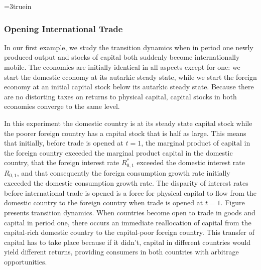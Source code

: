 \centerline{\epsfxsize=3truein}
\caption{Response to unforeseen opening of trade at time $1$.
From left to right, top to bottom: $k, c, \bar R, \eta, x,$ and $B^f$. The solid line is the domestic country, the dashed line is the foreign
country and the dashed dotted line is the original
steady state in the domestic economy.}
\endfigure


\subsubsection{Opening International Trade}
In our
first example, we study the transition dynamics  when  in period one
newly produced output and stocks of capital both   suddenly  become internationally mobile. The  economies are initially
identical
in all  aspects except for one: we start the domestic
economy at its  autarkic steady state, while we start the  foreign economy
at an initial capital stock  below its autarkic steady state. Because  there are no
distorting  taxes on returns to physical capital, capital stocks in both economies   converge to the same level.

In this experiment the domestic country is at its steady state capital stock while the poorer foreign country
has a capital stock that is half as large.  This means that initially, before trade is opened at $t=1$, the
marginal product of capital in the foreign country exceeded the marginal product capital in the domestic country, that the
foreign interest rate $R_{0,1}^*$ exceeded the domestic interest rate $R_{0,1}$, and that consequently the foreign consumption growth rate initially  exceeded the
domestic consumption growth rate. The disparity of interest rates before international trade is opened is a force for physical capital to flow from the domestic
country to the foreign country  when trade is opened at $t=1$.
Figure  presents  transition dynamics. When countries
become open to trade in goods and capital in period one, there occurs an immediate reallocation of capital from the
capital-rich domestic country to the capital-poor foreign country. This transfer of capital has to take place because if it didn't,
  capital
in different countries  would yield different returns, providing consumers in both countries with arbitrage opportunities.


